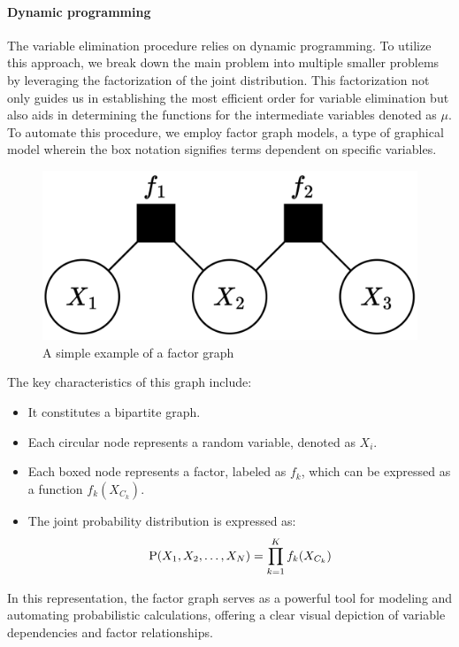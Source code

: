\paragraph*{Dynamic programming}
The variable elimination procedure relies on dynamic programming. 
To utilize this approach, we break down the main problem into multiple smaller problems by leveraging the factorization of the joint distribution. 
This factorization not only guides us in establishing the most efficient order for variable elimination but also aids in determining the functions for the intermediate variables denoted as $\mu$.
To automate this procedure, we employ factor graph models, a type of graphical model wherein the box notation signifies terms dependent on specific variables. 
\begin{figure}[H]
    \centering
    \includegraphics[width=0.25\linewidth]{images/fg.png}
    \caption{A simple example of a factor graph}
\end{figure}
The key characteristics of this graph include:
\begin{itemize}
    \item It constitutes a bipartite graph.
    \item Each circular node represents a random variable, denoted as $X_i$.
    \item Each boxed node represents a factor, labeled as $f_k$, which can be expressed as a function $f_k(X_{C_k})$. 
    \item The joint probability distribution is expressed as:
        \[\textnormal{P}(X_1,X_2,\dots,X_N)=\prod_{k=1}^K{f_k(X_{C_k})}\]
\end{itemize}
In this representation, the factor graph serves as a powerful tool for modeling and automating probabilistic calculations, offering a clear visual depiction of variable dependencies and factor relationships.

